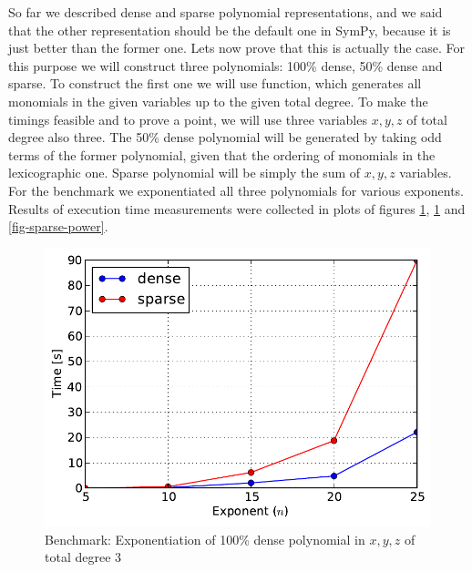 So far we described dense and sparse polynomial representations, and we said that the
other representation should be the default one in SymPy, because it is just better
than the former one. Lets now prove that this is actually the case. For this purpose
we will construct three polynomials: 100\% dense, 50\% dense and sparse. To construct
the first one we will use  function, which generates all monomials
in the given variables up to the given total degree. To make the timings feasible and
to prove a point, we will use three variables $x,y,z$ of total degree also three. The
50\% dense polynomial will be generated by taking odd terms of the former polynomial,
given that the ordering of monomials in the lexicographic one. Sparse polynomial will
be simply the sum of $x,y,z$ variables. For the benchmark we exponentiated all three
polynomials for various exponents. Results of execution time measurements were collected
in plots of figures \ref{fig-100-dense-power}, \ref{fig-100-dense-power} and
\ref{fig-sparse-power}.
\begin{figure}[htbp]
\centering

\includegraphics{100-dense-power.pdf}
\caption{Benchmark: Exponentiation of 100\% dense polynomial in $x,y,z$ of total degree 3\label{fig-100-dense-power}}\end{figure}
